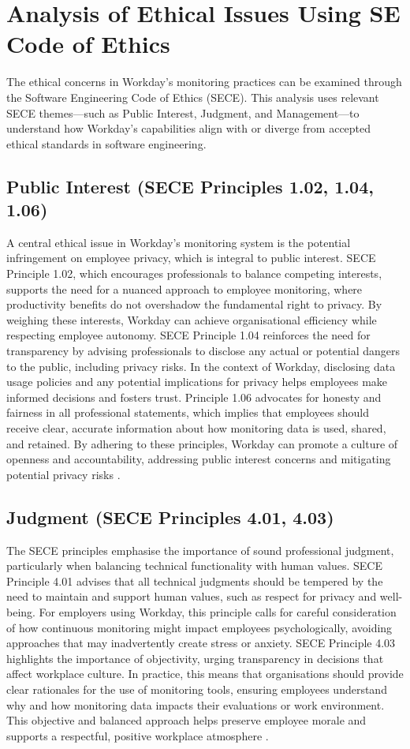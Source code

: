 \documentclass[a4paper]{article}
\begin{document}
\section{Analysis of Ethical Issues Using SE Code of Ethics}
The ethical concerns in Workday’s monitoring practices can be examined through the Software Engineering Code of Ethics (SECE). This analysis uses relevant SECE themes—such as Public Interest, Judgment, and Management—to understand how Workday’s capabilities align with or diverge from accepted ethical standards in software engineering.

\subsection{Public Interest (SECE Principles 1.02, 1.04, 1.06)}
A central ethical issue in Workday’s monitoring system is the potential infringement on employee privacy, which is integral to public interest. SECE Principle 1.02, which encourages professionals to balance competing interests, supports the need for a nuanced approach to employee monitoring, where productivity benefits do not overshadow the fundamental right to privacy. By weighing these interests, Workday can achieve organisational efficiency while respecting employee autonomy. SECE Principle 1.04 reinforces the need for transparency by advising professionals to disclose any actual or potential dangers to the public, including privacy risks. In the context of Workday, disclosing data usage policies and any potential implications for privacy helps employees make informed decisions and fosters trust. Principle 1.06 advocates for honesty and fairness in all professional statements, which implies that employees should receive clear, accurate information about how monitoring data is used, shared, and retained. By adhering to these principles, Workday can promote a culture of openness and accountability, addressing public interest concerns and mitigating potential privacy risks \citep{Zuboff2019}.

\subsection{Judgment (SECE Principles 4.01, 4.03)}
The SECE principles emphasise the importance of sound professional judgment, particularly when balancing technical functionality with human values. SECE Principle 4.01 advises that all technical judgments should be tempered by the need to maintain and support human values, such as respect for privacy and well-being. For employers using Workday, this principle calls for careful consideration of how continuous monitoring might impact employees psychologically, avoiding approaches that may inadvertently create stress or anxiety. SECE Principle 4.03 highlights the importance of objectivity, urging transparency in decisions that affect workplace culture. In practice, this means that organisations should provide clear rationales for the use of monitoring tools, ensuring employees understand why and how monitoring data impacts their evaluations or work environment. This objective and balanced approach helps preserve employee morale and supports a respectful, positive workplace atmosphere \citep{Ajunwa2017, Moore2018}.
\end{document}
